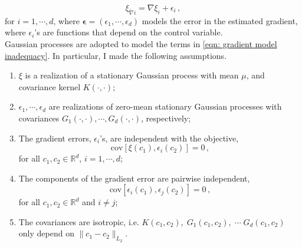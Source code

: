 \begin{equation}
    \left.\xi_{\tilde{\nabla}i}\right. 
    = \left. \nabla \xi_i\right. + 
      {{\epsilon}_i}\,,
    \label{eqn: gradient model inadequacy}
\end{equation}
for $i=1,\cdots, d$, where $\boldsymbol{\epsilon}=(\epsilon_1, \cdots, \epsilon_d)$ models
the error in the estimated gradient, where $\epsilon_i$'s are functions that depend on the
control variable.\\

Gaussian processes are adopted to model the terms in \eqref{eqn: gradient model inadequacy}. 
In particular, I made the following assumptions.
\begin{enumerate}
     \item $\xi$ is a realization of a stationary Gaussian process with mean $\mu$,
           and covariance kernel $K(\cdot, \cdot)$;
     \item $\epsilon_1, \cdots, \epsilon_d$ are realizations of zero-mean stationary
           Gaussian processes with covariances $G_1(\cdot, \cdot), \cdots, 
           G_d(\cdot, \cdot)$, respectively;
     \item The gradient errors, $\epsilon_i$'s, are independent with the objective,
     \begin{equation}
         \textrm{cov} \left[\xi(c_1), {\epsilon}_i(c_2) \right] = 0\,,
     \end{equation}
     for all $c_1, c_2 \in \mathbb{R}^d$, $i=1,\cdots, d$;
     \item The components of the gradient error are pairwise independent,
      $$
         \textrm{cov} \left[\epsilon_i(c_1), \epsilon_j(c_2)\right] = 0\,,
      $$
      for all $c_1, c_2 \in \mathbb{R}^d$ and $i\neq j$;
      \item The covariances are isotropic, i.e.
      $K(c_1, c_2), \; G_1(c_1, c_2),\; \cdots\; G_d(c_1, c_2)$ only depend on
      $\big\|c_1-c_2\big\|_{L_2}$.
\end{enumerate}

